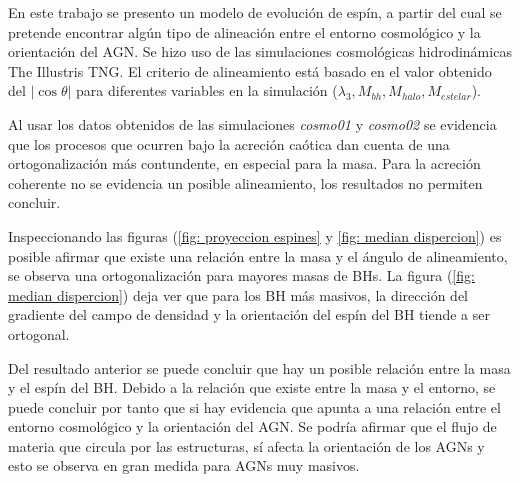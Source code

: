 
En este trabajo se presento un modelo de evolución de espín, a partir del cual se pretende encontrar algún tipo de alineación entre el entorno cosmológico y la orientación del AGN. Se hizo uso de las simulaciones cosmológicas hidrodinámicas The Illustris TNG. El criterio de alineamiento está basado en el valor obtenido del $|\cos \theta|$ para diferentes variables en la simulación ($\lambda_{3}, M_{bh}, M_{halo}, M_{estelar}$). 

Al usar los datos obtenidos de las simulaciones {\it{cosmo01}} y {\it{cosmo02}} se evidencia que los procesos que ocurren bajo la acreción caótica dan cuenta de una ortogonalización más contundente, en especial para la masa. Para la acreción coherente no se evidencia un posible alineamiento, los resultados no permiten concluir. 

Inspeccionando las figuras (\ref{fig: proyeccion espines} y \ref{fig: median dispercion}) es posible afirmar que existe una relación entre la masa y el ángulo de alineamiento, se observa una ortogonalización  para mayores masas de BHs. La figura (\ref{fig: median dispercion}) deja ver que para los BH más masivos, la dirección del gradiente del campo de densidad y la orientación del espín del BH tiende a ser ortogonal. 

Del resultado anterior se puede concluir que hay un posible relación entre la masa y el espín del BH. Debido a la relación que existe entre la masa y el entorno, se puede concluir por tanto que si hay evidencia que apunta a una relación entre el entorno cosmológico y la orientación del AGN. Se podría afirmar que el flujo de materia que circula por las estructuras, sí afecta la orientación de los AGNs y esto se observa en gran medida para AGNs muy masivos.





